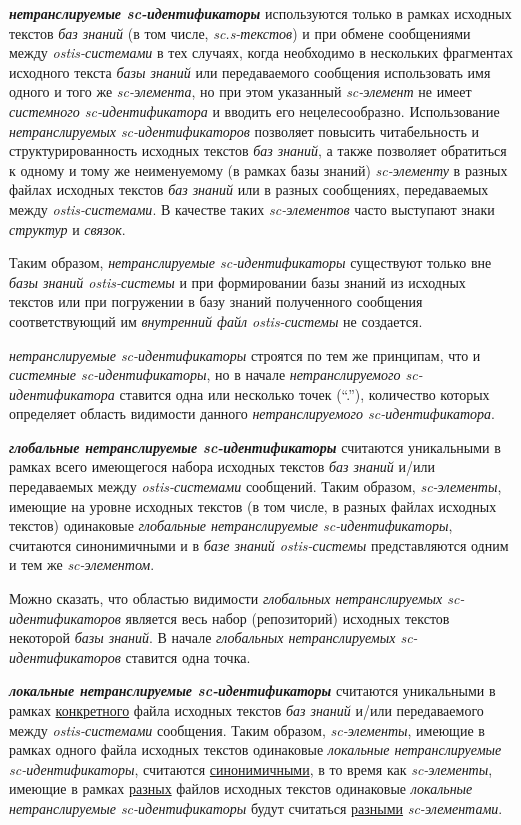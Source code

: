 \textbf{\textit{нетранслируемые sc-идентификаторы}} используются только в рамках исходных текстов \textit{баз знаний} (в том числе, \textit{sc.s-текстов}) и при обмене сообщениями между \textit{ostis-системами} в тех случаях, когда необходимо в нескольких фрагментах исходного текста \textit{базы знаний} или передаваемого сообщения использовать имя одного и того же \textit{sc-элемента}, но при этом указанный \textit{sc-элемент} не имеет \textit{системного sc-идентификатора} и вводить его нецелесообразно. Использование \textit{нетранслируемых sc-идентификаторов} позволяет повысить читабельность и структурированность исходных текстов \textit{баз знаний}, а также позволяет обратиться к одному и тому же неименуемому (в рамках базы знаний) \textit{sc-элементу} в разных файлах исходных текстов \textit{баз знаний} или в разных сообщениях, передаваемых между \textit{ostis-системами}. В качестве таких \textit{sc-элементов} часто выступают знаки \textit{структур} и \textit{связок}.

Таким образом, \textit{нетранслируемые sc-идентификаторы} существуют только вне \textit{базы знаний ostis-системы} и при формировании базы знаний из исходных текстов или при погружении в базу знаний полученного сообщения соответствующий им \textit{внутренний файл ostis-системы} не создается.

\textit{нетранслируемые sc-идентификаторы} строятся по тем же принципам, что и \textit{системные sc-идентификаторы}, но в начале \textit{нетранслируемого sc-идентификатора} ставится одна или несколько точек (``.''), количество которых определяет область видимости данного \textit{нетранслируемого sc-идентификатора}.

\textbf{\textit{глобальные нетранслируемые sc-идентификаторы}} считаются уникальными в рамках всего имеющегося набора исходных текстов \textit{баз знаний} и/или передаваемых между \textit{ostis-системами} сообщений. Таким образом, \textit{sc-элементы}, имеющие на уровне исходных текстов (в том числе, в разных файлах исходных текстов) одинаковые \textit{глобальные нетранслируемые sc-идентификаторы}, считаются синонимичными и в \textit{базе знаний ostis-системы} представляются одним и тем же \textit{sc-элементом}.

Можно сказать, что областью видимости \textit{глобальных нетранслируемых sc-идентификаторов} является весь набор (репозиторий) исходных текстов некоторой \textit{базы знаний}. В начале \textit{глобальных нетранслируемых sc-идентификаторов} ставится одна точка.

\textbf{\textit{локальные нетранслируемые sc-идентификаторы}} считаются уникальными в рамках \uline{конкретного} файла исходных текстов \textit{баз знаний} и/или передаваемого между \textit{ostis-системами} сообщения. Таким образом, \textit{sc-элементы}, имеющие в рамках одного файла исходных текстов одинаковые \textit{локальные нетранслируемые sc-идентификаторы}, считаются \uline{синонимичными}, в то время как \textit{sc-элементы}, имеющие в рамках \uline{разных} файлов исходных текстов одинаковые \textit{локальные нетранслируемые sc-идентификаторы} будут считаться \uline{разными} \textit{sc-элементами}.


